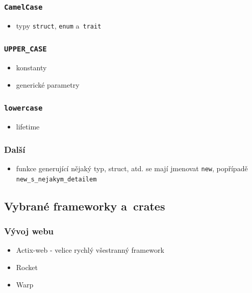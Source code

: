 \documentclass[a4paper, 12pt]{article} %
\newcommand{\rust}[1]{\texttt{#1}}
\begin{document}
        \subsubsection*{\texttt{CamelCase}}
            \begin{itemize}
                \item typy \texttt{struct}, \texttt{enum} a~\texttt{trait}
            \end{itemize}


        \subsubsection*{\texttt{UPPER\_CASE}}
            \begin{itemize}
                \item konstanty
                \item generické parametry
            \end{itemize}


        \subsubsection*{\texttt{lowercase}}
            \begin{itemize}
                \item lifetime
            \end{itemize}


        \subsubsection*{Další}
            \begin{itemize}
                \item funkce generující nějaký typ, struct, atd. se mají jmenovat \rust{new}, popřípadě \rust{new_s_nejakym_detailem}
                
                \hypertarget{_}{}
            \end{itemize}\cite{convention}


    \subsection{Vybrané frameworky a~crates}
        \subsubsection*{Vývoj webu}
            \begin{itemize} 
                \item Actix-web - velice rychlý všestranný framework
                \item Rocket
                \item Warp
            \end{itemize}
\end{document}
